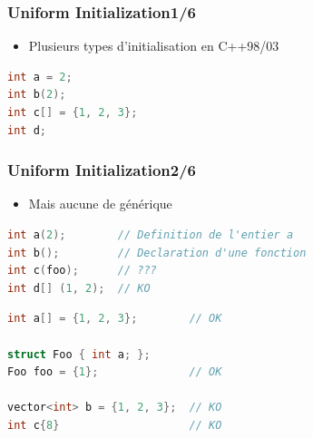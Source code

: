 \documentclass[C++.tex]{subfiles}
\begin{document}
\begin{frame}[fragile]
	\frametitle{Uniform Initialization\titlehfill{}1/6}
	\begin{itemize}
		\item Plusieurs types d'initialisation en C++98/03
	\end{itemize}

	\begin{lstlisting}[language=C++]
int a = 2;
int b(2);
int c[] = {1, 2, 3};
int d;\end{lstlisting}
\end{frame}

\begin{frame}[fragile]
	\frametitle{Uniform Initialization\titlehfill{}2/6}
	\begin{itemize}
		\item Mais aucune de générique
	\end{itemize}

	\begin{lstlisting}[language=C++]
int a(2);        // Definition de l'entier a
int b();         // Declaration d'une fonction
int c(foo);      // ???
int d[] (1, 2);  // KO\end{lstlisting}


	\pause

	\begin{lstlisting}[language=C++]
int a[] = {1, 2, 3};        // OK

struct Foo { int a; };
Foo foo = {1};              // OK

vector<int> b = {1, 2, 3};  // KO
int c{8}                    // KO\end{lstlisting}

\end{frame}
\end{document}
